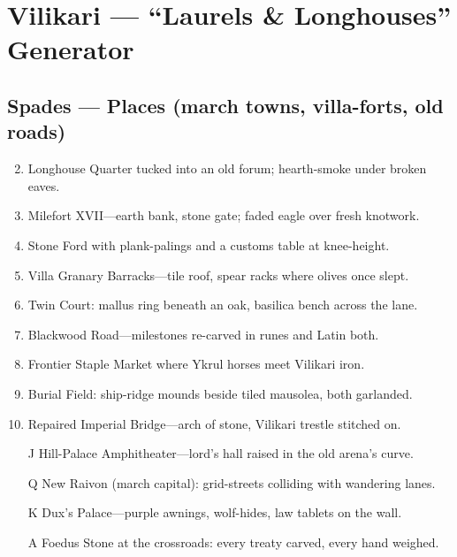 \chapter{Vilikari --- ``Laurels \& Longhouses'' Generator}

\section*{Spades --- Places (march towns, villa-forts, old roads)}
\begin{enumerate}
\setcounter{enumi}{1}
\item Longhouse Quarter tucked into an old forum; hearth-smoke under broken eaves.
\item Milefort XVII---earth bank, stone gate; faded eagle over fresh knotwork.
\item Stone Ford with plank-palings and a customs table at knee-height.
\item Villa Granary Barracks---tile roof, spear racks where olives once slept.
\item Twin Court: mallus ring beneath an oak, basilica bench across the lane.
\item Blackwood Road---milestones re-carved in runes and Latin both.
\item Frontier Staple Market where Ykrul horses meet Vilikari iron.
\item Burial Field: ship-ridge mounds beside tiled mausolea, both garlanded.
\item Repaired Imperial Bridge---arch of stone, Vilikari trestle stitched on.
\item[J] Hill-Palace Amphitheater---lord's hall raised in the old arena's curve.
\item[Q] New Raivon (march capital): grid-streets colliding with wandering lanes.
\item[K] Dux's Palace---purple awnings, wolf-hides, law tablets on the wall.
\item[A] Foedus Stone at the crossroads: every treaty carved, every hand weighed.
\end{enumerate}

